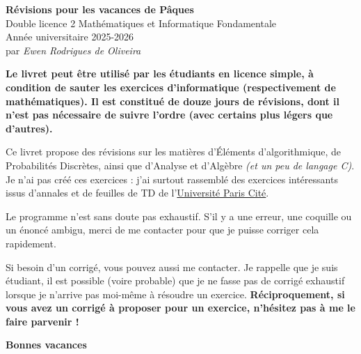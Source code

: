 \documentclass{article}
\begin{document}
\thispagestyle{empty}

\newcommand{\doctitle}{Révisions pour les vacances de Pâques}

\vspace*{\fill}

\begin{center}
    {\LARGE\textbf{\doctitle}}\\[0.6em]
    {\Large Double licence 2 Mathématiques et Informatique  Fondamentale}\\[2em]
    {\large Année universitaire 2025-2026}\\[0.25em]
    {\large par \textit{Ewen Rodrigues de Oliveira}}
\end{center}

\vfill

\noindent
\textbf{Le livret peut être utilisé par les étudiants en licence simple, à condition de sauter les exercices d'informatique (respectivement de mathématiques). Il est constitué de douze jours de révisions, dont il n'est pas nécessaire de suivre l'ordre (avec certains plus légers que d'autres).}
\medskip

\noindent
Ce livret propose des révisions sur les matières d'Éléments d'algorithmique, de Probabilités Discrètes, ainsi que d'Analyse et d'Algèbre \textit{(et un peu de langage C)}. Je n'ai pas créé ces exercices : j'ai surtout rassemblé des exercices intéressants issus d'annales et de feuilles de TD de l'\href{https://u-pariscite.fr/}{Université Paris Cité}.

\medskip

\noindent
Le programme n'est sans doute pas exhaustif. S'il y a une erreur, une coquille ou un énoncé ambigu, merci de me contacter pour que je puisse corriger cela rapidement.

\medskip

\noindent
Si besoin d'un corrigé, vous pouvez aussi me contacter. Je rappelle que je suis étudiant, il est possible (voire probable) que je ne fasse pas de corrigé exhaustif lorsque je n'arrive pas moi-même à résoudre un exercice. \textbf{Réciproquement, si vous avez un corrigé à proposer pour un exercice, n'hésitez pas à me le faire parvenir !}


\begin{flushright}
\textbf{Bonnes vacances \faSmile}
\end{flushright}
\end{document}
